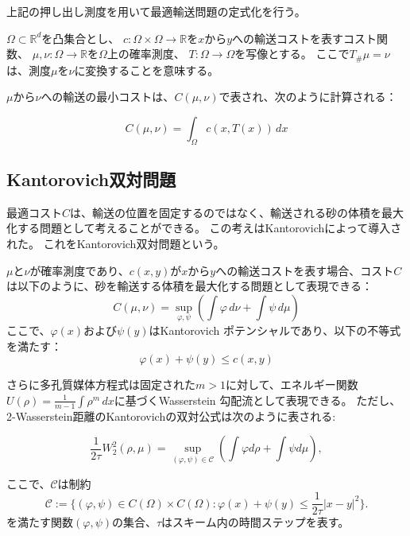 上記の押し出し測度を用いて最適輸送問題の定式化を行う。

\begin{monge}
    $\Omega \subset \mathbb{R}^d$を凸集合とし、
    $c : \Omega \times \Omega \to \mathbb{R}$を$x$から$y$への輸送コストを表すコスト関数、
    $\mu, \nu : \Omega \to \mathbb{R}$を$\Omega$上の確率測度、
    $T : \Omega \to \Omega$を写像とする。
    ここで$T_\#\mu = \nu$は、測度$\mu$を$\nu$に変換することを意味する。

    $\mu$から$\nu$への輸送の最小コストは、$C(\mu, \nu)$で表され、次のように計算される：

    \[
    C(\mu, \nu) = \int_{\Omega} c(x, T(x)) \,dx
    \]
\end{monge}

\subsection{Kantorovich双対問題}
\label{sect:Kantorovich双対問題}
最適コスト$C$は、輸送の位置を固定するのではなく、輸送される砂の体積を最大化する問題として考えることができる。
この考えはKantorovichによって導入された。\cite{MR0096552}
これをKantorovich双対問題という。


\begin{Kantorovich}
$\mu$と$\nu$が確率測度であり、$c(x, y)$が$x$から$y$への輸送コストを表す場合、コスト$C$は以下のように、砂を輸送する体積を最大化する問題として表現できる：
\[
    C(\mu, \nu) = \sup_{\varphi, \psi} \left( \int \varphi \,d\nu + \int \psi \,d\mu \right)
\]
ここで、$\varphi(x)$および$\psi(y)$はKantorovich ポテンシャルであり、以下の不等式を満たす：
\[
    \varphi(x) + \psi(y) \leq c(x, y)
\]
\end{Kantorovich}
さらに多孔質媒体方程式は固定された$m > 1$に対して、エネルギー関数$U(\rho) = \frac{1}{m - 1} \int \rho^m \, dx$に基づくWasserstein 勾配流として表現できる。
ただし、2-Wasserstein距離のKantorovichの双対公式は次のように表される:

\begin{equation}
    \label{eq:wasserstein dual}
    \frac{1}{2\tau} W_2^2(\rho, \mu) = \sup_{(\varphi, \psi) \in \mathcal{C}} \left( \int \varphi d\rho + \int \psi d\mu \right),
\end{equation}

ここで、$\mathcal{C}$は制約
\[
    \mathcal{C}  := \{(\varphi, \psi) \in C(\Omega) \times C(\Omega) : \varphi(x) + \psi(y) \leq \frac{1}{2 \tau} |x - y|^2 \}. 
\]
を満たす関数$(\varphi, \psi)$の集合、$\tau$はスキーム内の時間ステップを表す。


